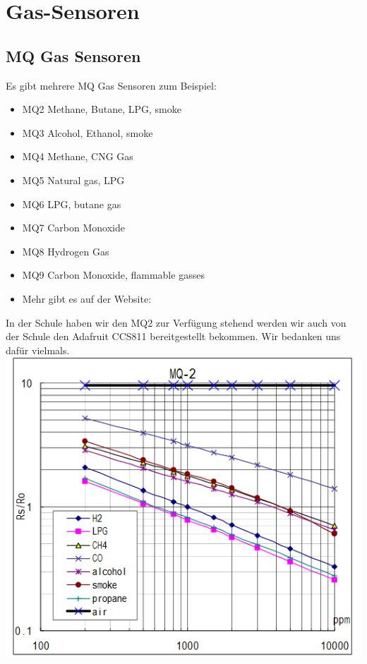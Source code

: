 \newpage
\def \currentAuthor{Kevin Glatz}


\section{Gas-Sensoren}

\subsection{MQ Gas Sensoren}
Es gibt mehrere MQ Gas Sensoren zum Beispiel:

\begin{itemize}
\item {MQ2}
	Methane, Butane, LPG, smoke
\item {MQ3}
	Alcohol, Ethanol, smoke
\item {MQ4}
	Methane, CNG Gas
\item {MQ5}
	Natural gas, LPG
\item {MQ6}
	LPG, butane gas
\item {MQ7}
	Carbon Monoxide
\item {MQ8}
	Hydrogen Gas
\item {MQ9}
	Carbon Monoxide, flammable gasses
\item Mehr gibt es auf der Website: \cite{MQ_Sensoren}
\end{itemize}

In der Schule haben wir den MQ2 zur Verfügung stehend werden wir auch von der Schule den Adafruit CCS811 bereitgestellt bekommen. Wir bedanken uns dafür vielmals.
\newline
{\includegraphics[width=0.8\linewidth]{figures/DatasheetMQ2.png}}{\cite{MQ_Datasheet}}

